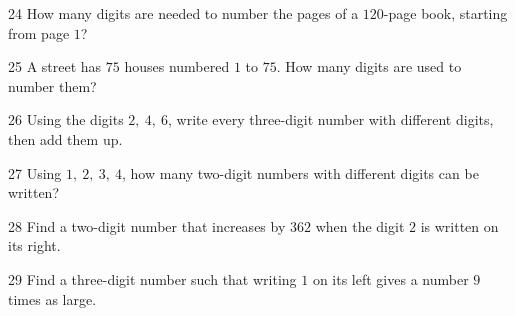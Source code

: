 \gap
\begin{probbox}{24}{\relax}
How many digits are needed to number the pages of a $120$-page book, starting from page $1$?
\end{probbox}
\gap
\begin{probbox}{25}{\relax}
A street has $75$ houses numbered $1$ to $75$. How many digits are used to number them?
\end{probbox}
\gap
\begin{probbox}{26}{\relax}
Using the digits $2,\ 4,\ 6$, write every three-digit number with different digits, then add them up.
\end{probbox}
\gap
\begin{probbox}{27}{\relax}
Using $1,\ 2,\ 3,\ 4$, how many two-digit numbers with different digits can be written?
\end{probbox}
\gap
\begin{probbox}{28}{\relax}
Find a two-digit number that increases by $362$ when the digit $2$ is written on its right.
\end{probbox}
\gap
\begin{probbox}{29}{\relax}
Find a three-digit number such that writing $1$ on its left gives a number $9$ times as large.
\end{probbox}
